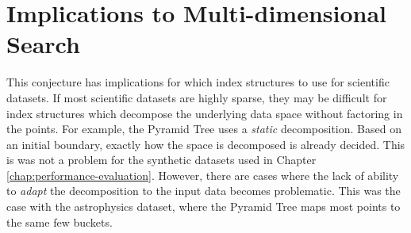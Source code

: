 \section{Implications to Multi-dimensional Search}
\label{sec:implications-to-md-search}

This conjecture has implications for which index structures to use for scientific datasets. If most scientific datasets are highly sparse, they may be difficult for index structures which decompose the underlying data space without factoring in the points. For example, the Pyramid Tree uses a \textit{static} decomposition. Based on an initial boundary, exactly how the space is decomposed is already decided. This is was not a problem for the synthetic datasets used in Chapter \ref{chap:performance-evaluation}. However, there are cases where the lack of ability to \textit{adapt} the decomposition to the input data becomes problematic. This was the case with the astrophysics dataset, where the Pyramid Tree maps most points to the same few buckets.

